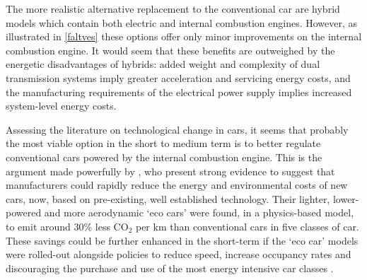 The more realistic alternative replacement to the conventional car are hybrid
models which contain both electric and internal combustion engines. However,
as illustrated in \cref{faltves} these options offer only minor improvements
on the internal combustion engine. It would seem that these benefits are
outweighed by the energetic disadvantages of hybrids:
added weight and complexity of dual transmission systems imply greater
acceleration and servicing energy costs, and
the manufacturing requirements of  the electrical
power supply implies increased system-level energy costs.

Assessing the literature on technological change in cars, it seems that
probably the most viable option in the short to medium term is to better
regulate conventional cars powered by the internal combustion engine.
This is the argument made powerfully by \citep{plowden2008cars}, who present
strong evidence to suggest that manufacturers could rapidly reduce the
energy and environmental costs of new cars, now, based on pre-existing,
well established technology. Their lighter, lower-powered and more
aerodynamic `eco cars' were found, in a physics-based model, to emit
around 30\% less CO$_2$ per km than conventional cars in five classes of
car. These savings could be further enhanced in the short-term if the `eco car'
models were rolled-out alongside policies to reduce speed, increase occupancy
rates and discouraging the purchase and use of the most energy intensive
car classes \citep{plowden2008cars}.

